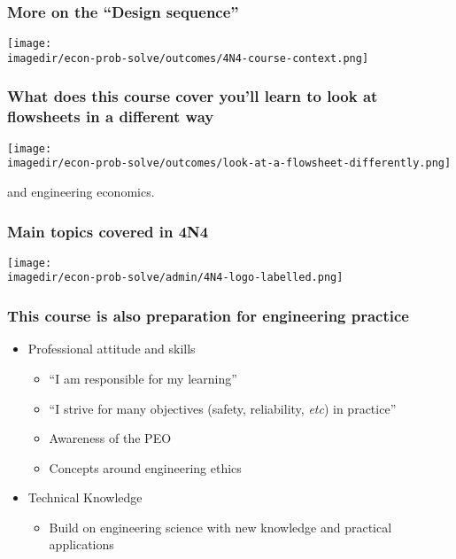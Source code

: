\begin{frame}\frametitle{More on the ``Design sequence''}
	\begin{center}
		\texttt{[image: \\imagedir/econ-prob-solve/outcomes/4N4-course-context.png]}
	\end{center}
\end{frame}

\begin{frame}\frametitle{What does this course cover {\scriptsize you'll learn to look at flowsheets in a different way}}
	\begin{center}
		\texttt{[image: \\imagedir/econ-prob-solve/outcomes/look-at-a-flowsheet-differently.png]}
	\end{center}
	and engineering economics.
\end{frame}

\begin{frame}\frametitle{Main topics covered in 4N4}
	\begin{center}
		\texttt{[image: \\imagedir/econ-prob-solve/admin/4N4-logo-labelled.png]}
	\end{center}
	\vspace{-12pt}
	{\small {\color{brown}{This is a unique course: not taught anywhere else in Canada.}}}
\end{frame}

\begin{frame}\frametitle{This course is also preparation for engineering practice}
	\begin{itemize}
		\item	Professional attitude and skills
		\begin{itemize}
			\item	``I am responsible for my learning''
			\item	``I strive for many objectives (safety, reliability, \emph{etc}) in practice''
			\item	Awareness of the PEO
			\item	Concepts around engineering ethics
		\end{itemize}
		\item	Technical Knowledge
		\begin{itemize}
			\item	Build on {\color{purple} engineering science} with new knowledge and practical applications
		\end{itemize}
	\end{itemize}
\end{frame}


